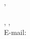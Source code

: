 \begin{center}
    \fontsize{14}{17}\selectfont\textbf{\myJudulIndonesia} %
    \vspace{0.8cm}

    \fontsize{12}{14.4}\selectfont %
    \myPenulis, \myPembimbing \\
    \vspace{0.3cm}
    \myDepartment \\
    \myFaculty, \myUniversity, \myAddress \\
    \vspace{0.3cm}
    E-mail: \myEmail
\end{center}
